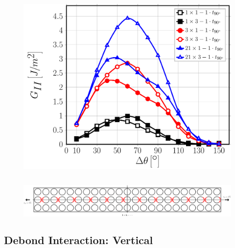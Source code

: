 \documentclass[first,firstsupp,lastsupp,last,hyperref,table]{ETHclass}
\begin{document}
\begin{frame}
\begin{columns}[c]
\begin{column}{0.5\textwidth}
\begin{figure}
\includegraphics[width=\columnwidth]{nxk-1-vf60-GII-crackshield1.pdf}
\end{figure}
\end{column}
\end{columns}
\begin{figure}
\centering
\includegraphics[width=\textwidth]{twofibers-sameside-crackshielding1.pdf}
\end{figure}
\end{frame}

\subsection{Debond Interaction: Vertical}
\end{document}
